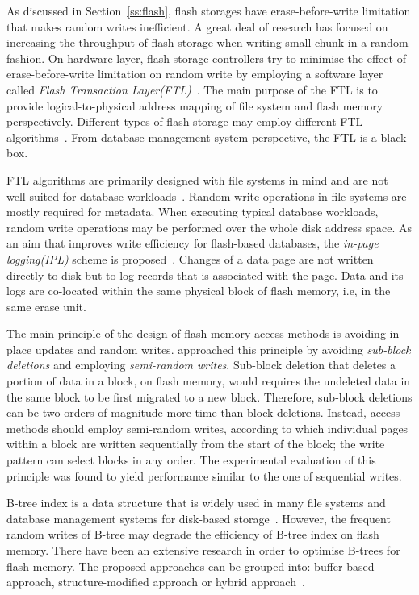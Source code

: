 As discussed in Section~\ref{ss:flash}, flash storages have erase-before-write limitation that makes random writes inefficient.
A great deal of research has focused on increasing the throughput of flash storage when writing small chunk in a random fashion.
On hardware layer, flash storage controllers try to minimise the effect of erase-before-write limitation on random write by employing a software layer called \textit{Flash Transaction Layer(FTL)}~\citep{intel:1998}.
The main purpose of the FTL is to provide logical-to-physical address mapping of file system and flash memory perspectively.
Different types of flash storage may employ different FTL algorithms~\citep{Chung:2009}.
From database management system perspective, the FTL is a black box.

FTL algorithms are primarily designed with file systems in mind and are not well-suited for database workloads~\citep{Lee:2007}.
Random write operations in file systems are mostly required for metadata. 
When executing typical database workloads, random write operations may be performed over the whole disk address space. 
As an aim that improves write efficiency for flash-based databases, the \textit{in-page logging(IPL)} scheme is proposed~\citep{Lee:2007}.
Changes of a data page are not written directly to disk but to log records that is associated with the page.
Data and its logs are co-located within the same physical block of flash memory, i.e, in the same erase unit.

The main principle of the design of flash memory access methods is avoiding in-place updates and random writes.
\cite{Nath:2008} approached this principle by avoiding \textit{sub-block deletions} and employing \textit{semi-random writes}.
Sub-block deletion that deletes a portion of data in a block, on flash memory, would requires the undeleted data in the same block to be first migrated to a new block.
Therefore, sub-block deletions can be two orders of magnitude more time than block deletions.
Instead, access methods should employ semi-random writes, according to which individual pages within a block are written sequentially from the start of the block; the write pattern can select blocks in any order.
The experimental evaluation of this principle was found to yield performance similar to the one of sequential writes.

B-tree index is a data structure that is widely used in many file systems and database management systems for disk-based storage~\citep{Ullman:2001}. 
However, the frequent random writes of B-tree may degrade the efficiency of B-tree index on flash memory.
There have been an extensive research in order to optimise B-trees for flash memory.
The proposed approaches can be grouped into: buffer-based approach, structure-modified approach or hybrid approach~\citep{Ho:2016}.

